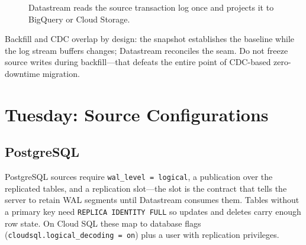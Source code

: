 \begin{figure}[H]
    \centering
    \caption{Datastream reads the source transaction log once and projects it to BigQuery or Cloud Storage.}
    \label{fig:ch11-datastream-architecture}
\end{figure}

\begin{notebox}
Backfill and CDC overlap by design: the snapshot establishes the baseline while the log stream buffers changes; Datastream reconciles the seam. Do not freeze source writes during backfill---that defeats the entire point of CDC-based zero-downtime migration.
\end{notebox}

\section{Tuesday: Source Configurations}

\subsection{PostgreSQL}
PostgreSQL sources require \texttt{wal\_level = logical}, a publication over the replicated tables, and a replication slot---the slot is the contract that tells the server to retain WAL segments until Datastream consumes them. Tables without a primary key need \texttt{REPLICA IDENTITY FULL} so updates and deletes carry enough row state. On Cloud SQL these map to database flags (\texttt{cloudsql.logical\_decoding = on}) plus a user with replication privileges.

